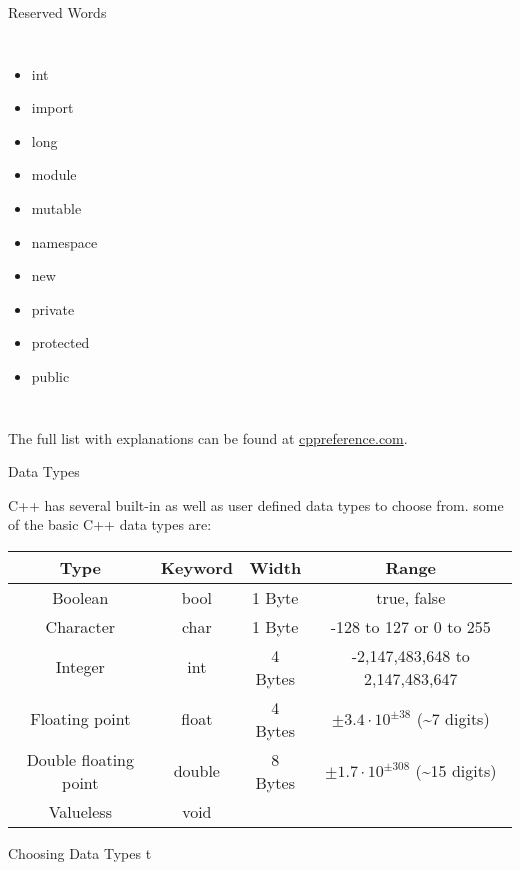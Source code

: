 \documentclass[../lecture2-variables.tex]{subfiles}
\begin{document}
\begin{frame}[fragile]{Reserved Words}
\begin{columns}
\begin{itemize}
                \item int
                \item import
                \item long
                \item module
                \item mutable
                \item namespace
                \item new
                \item private
                \item protected
                \item public
            \end{itemize}
    \end{columns}
    The full list with explanations can be found at \href{http://en.cppreference.com/w/cpp/keyword}{cppreference.com}.
\end{frame}


\begin{frame}[fragile]{Data Types}

    C++ has several built-in as well as user defined data types to choose from. \newline \newline
    some of the basic C++ data types are:
    \begin{table}
        \center
        \begin{tabular}{c|c|c|c}
            \toprule
            \textbf{Type} & \textbf{Keyword} & \textbf{Width} & \textbf{Range} \\
            \midrule
Boolean & bool & 1 Byte & true, false \\
Character & char & 1 Byte & -128 to 127 or 0 to 255 \\
Integer & int & 4 Bytes & -2,147,483,648 to 2,147,483,647 \\
Floating point & float & 4 Bytes & $\pm 3.4 \cdot 10^{\pm 38}$ (\textasciitilde7 digits) \\
Double floating point & double & 8 Bytes & $\pm 1.7 \cdot 10^{\pm 308}$ (\textasciitilde15 digits) \\
Valueless & void & & \\
            \bottomrule
        \end{tabular}
    \end{table}
\end{frame}


\begin{frame}[fragile]{Choosing Data Types}
t
\end{frame}

\end{document}
